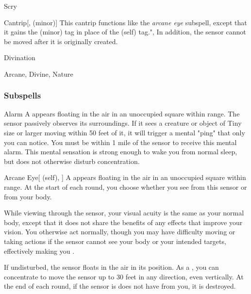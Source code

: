 \newpage
\begin{spellsection}{Scry}

\begin{spellheader}
\end{spellheader}


\begin{ability}{Cantrip}[,  (minor)]
This cantrip functions like the \textit{arcane eye} subspell, except that it gains the  (minor) tag in place of the  (self) tag.",
In addition, the sensor cannot be moved after it is originally created.
\end{ability}




 Divination

 Arcane, Divine, Nature
\end{spellsection}


\subsubsection{Subspells}


\begin{ability}[\nth{1}]{Alarm}
A  appears floating in the air in an unoccupied square within \rngmed range.
The sensor passively observes its surroundings.
If it sees a creature or object of Tiny size or larger moving within 50 feet of it, it will trigger a mental "ping" that only you can notice.
You must be within 1 mile of the sensor to receive this mental alarm.
This mental sensation is strong enough to wake you from normal sleep, but does not otherwise disturb concentration.
\end{ability}
\vspace{0.25em}


\begin{ability}[\nth{1}]{Arcane Eye}[ (self), ]
A  appears floating in the air in an unoccupied square within \rngmed range.
At the start of each round, you choose whether you see from this sensor or from your body.

While viewing through the sensor, your visual acuity is the same as your normal body, except that it does not share the benefits of any  effects that improve your vision.
You otherwise act normally, though you may have difficulty moving or taking actions if the sensor cannot see your body or your intended targets, effectively making you \blinded.

If undisturbed, the sensor floats in the air in its position.
As a , you can concentrate to move the sensor up to 30 feet in any direction, even vertically.
At the end of each round, if the sensor is does not have  from you, it is destroyed.
\end{ability}
\vspace{0.25em}



